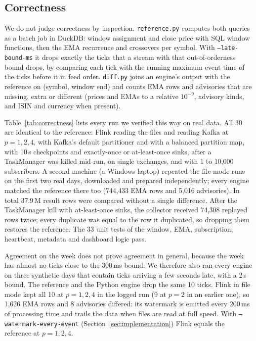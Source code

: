 \subsection{Correctness}
\label{sec:correctness}

We do not judge correctness by inspection. \texttt{reference.py} computes both queries as a batch job in DuckDB:
window assignment and close price with SQL window functions, then the EMA recurrence and crossovers per symbol.
With \texttt{--late-bound-ms} it drops exactly the ticks that a stream with that out-of-orderness bound drops,
by comparing each tick with the running maximum event time of the ticks before it in feed order.
\texttt{diff.py} joins an engine's output with the reference on (symbol, window end) and counts EMA rows and
advisories that are missing, extra or different (prices and EMAs to a relative $10^{-9}$, advisory kinds,
and ISIN and currency when present).

Table~\ref{tab:correctness} lists every run we verified this way on real data. All 30 are identical to the
reference: Flink reading the files and reading Kafka at $p=1,2,4$, with Kafka's default partitioner and with a
balanced partition map, with 10\,s checkpoints and exactly-once or at-least-once sinks, after a TaskManager was
killed mid-run, on single exchanges, and with 1 to 10{,}000 subscribers. A second machine (a Windows laptop)
repeated the file-mode runs on the first two real days, downloaded and prepared independently; every engine
matched the reference there too (744{,}433 EMA rows and 5{,}016 advisories). In total 37.9\,M result rows were
compared without a single difference. After the TaskManager kill with at-least-once sinks, the collector
received 74{,}308 replayed rows twice; every duplicate was equal to the row it duplicated, so dropping them
restores the reference. The 33 unit tests of the window, EMA, subscription, heartbeat, metadata and dashboard logic pass.

Agreement on the week does not prove agreement in general, because the week has almost no ticks close to the
300\,ms bound. We therefore also ran every engine on three synthetic days that contain ticks arriving a few
seconds late, with a 2\,s bound. The reference and the Python engine drop the same 10 ticks. Flink in file mode
kept all 10 at $p=1,2,4$ in the logged run (9 at $p=2$ in an earlier one), so 1{,}626 EMA rows and 8
advisories differed: its watermark is
emitted every 200\,ms of processing time and trails the data when files are read at full speed. With
\texttt{--watermark-every-event} (Section~\ref{sec:implementation}) Flink equals the reference at $p=1,2,4$.



